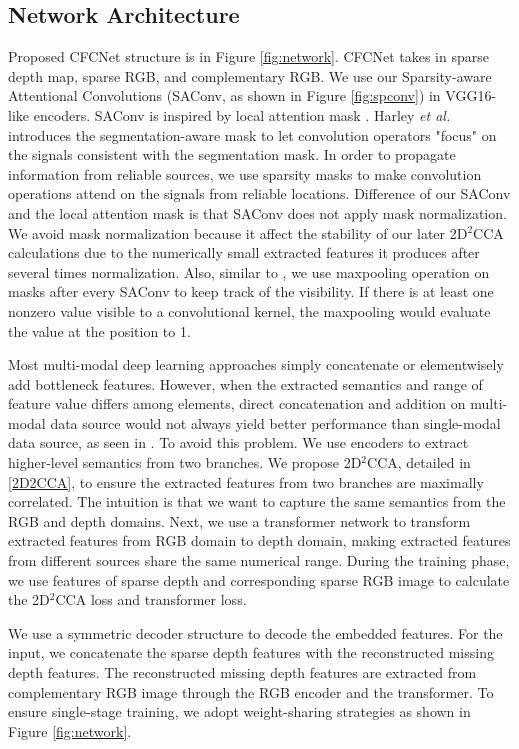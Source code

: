 \documentclass{article}
\begin{document}
\subsection{Network Architecture}
\label{Network}
Proposed CFCNet structure is in Figure \ref{fig:network}. CFCNet takes in sparse depth map, sparse RGB, and complementary RGB. We use our Sparsity-aware Attentional Convolutions (SAConv, as shown in Figure \ref{fig:spconv}) in VGG16-like encoders. SAConv is inspired by local attention mask \cite{harley_segaware}. Harley \textit{et al.} \cite{harley_segaware} introduces the segmentation-aware mask to let convolution operators "focus" on the signals consistent with the segmentation mask. In order to propagate information from reliable sources, we use sparsity masks to make convolution operations attend on the signals from reliable locations. Difference of our SAConv and the local attention mask is that SAConv does not apply mask normalization. We avoid mask normalization because it affect the stability of our later 2D$^2$CCA calculations due to the numerically small extracted features it produces after several times normalization. Also, similar to \cite{uhrig2017sparsity}, we use maxpooling operation on masks after every SAConv to keep track of the visibility. If there is at least one nonzero value visible to a convolutional kernel, the maxpooling would evaluate the value at the position to 1.

Most multi-modal deep learning approaches simply concatenate or elementwisely add bottleneck features. However, when the extracted semantics and range of feature value differs among elements, direct concatenation and addition on multi-modal data source would not always yield better performance than single-modal data source, as seen in \cite{ngiam2011multimodal, Jaritz_2018}. To avoid this problem. We use encoders to extract higher-level semantics from two branches. We propose 2D$^2$CCA, detailed in \ref{2D2CCA}, to ensure the extracted features from two branches are maximally correlated. The intuition is that we want to capture the same semantics from the RGB and depth domains. Next, we use a transformer network to transform extracted features from RGB domain to depth domain, making extracted features from different sources share the same numerical range. During the training phase, we use features of sparse depth and corresponding sparse RGB image to calculate the 2D$^2$CCA loss and transformer loss.

We use a symmetric decoder structure to decode the embedded features. For the input, we concatenate the sparse depth features with the reconstructed missing depth features. The reconstructed missing depth features are extracted from complementary RGB image through the RGB encoder and the transformer. To ensure single-stage training, we adopt weight-sharing strategies as shown in Figure \ref{fig:network}.
\end{document}
